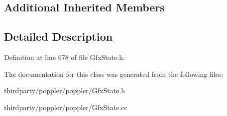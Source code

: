 \subsection*{Additional Inherited Members}


\subsection{Detailed Description}


Definition at line 678 of file Gfx\+State.\+h.



The documentation for this class was generated from the following files\+:\begin{DoxyCompactItemize}
\item 
thirdparty/poppler/poppler/Gfx\+State.\+h\item 
thirdparty/poppler/poppler/Gfx\+State.\+cc\end{DoxyCompactItemize}
